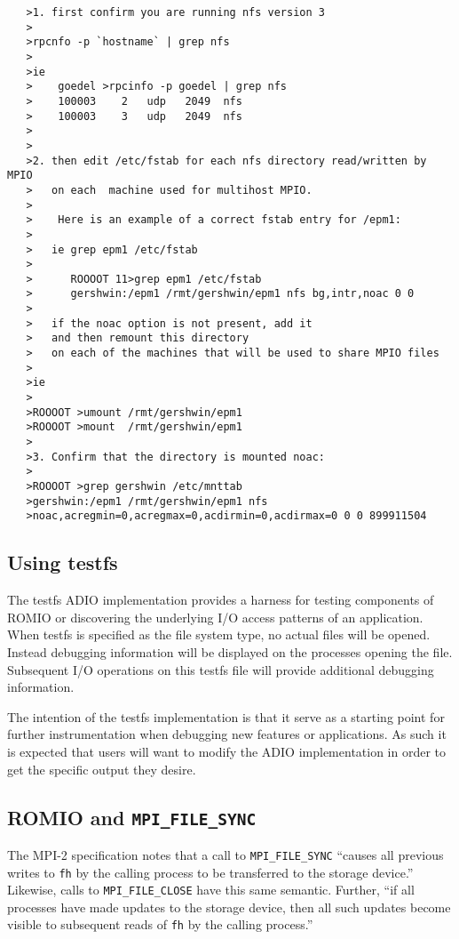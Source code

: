 \begin{verbatim}   
   >1. first confirm you are running nfs version 3
   >
   >rpcnfo -p `hostname` | grep nfs
   >
   >ie 
   >    goedel >rpcinfo -p goedel | grep nfs
   >    100003    2   udp   2049  nfs
   >    100003    3   udp   2049  nfs
   >
   >
   >2. then edit /etc/fstab for each nfs directory read/written by MPIO
   >   on each  machine used for multihost MPIO.
   >
   >    Here is an example of a correct fstab entry for /epm1:
   >
   >   ie grep epm1 /etc/fstab
   > 
   >      ROOOOT 11>grep epm1 /etc/fstab
   >      gershwin:/epm1 /rmt/gershwin/epm1 nfs bg,intr,noac 0 0
   >
   >   if the noac option is not present, add it 
   >   and then remount this directory
   >   on each of the machines that will be used to share MPIO files
   >
   >ie
   >
   >ROOOOT >umount /rmt/gershwin/epm1
   >ROOOOT >mount  /rmt/gershwin/epm1
   >
   >3. Confirm that the directory is mounted noac:
   >
   >ROOOOT >grep gershwin /etc/mnttab 
   >gershwin:/epm1 /rmt/gershwin/epm1 nfs
   >noac,acregmin=0,acregmax=0,acdirmin=0,acdirmax=0 0 0 899911504
\end{verbatim}

\subsection{Using testfs}
The testfs ADIO implementation provides a harness for testing components
of ROMIO or discovering the underlying I/O access patterns of an
application.  When testfs is specified as the file system type, no
actual files will be opened.  Instead debugging information will be
displayed on the processes opening the file.  Subsequent I/O operations
on this testfs file will provide additional debugging information.

The intention of the testfs implementation is that it serve as a
starting point for further instrumentation when debugging new features
or applications.  As such it is expected that users will want to modify
the ADIO implementation in order to get the specific output they desire.

\subsection{ROMIO and {\tt MPI\_FILE\_SYNC}}

The MPI-2 specification notes that a call to {\tt MPI\_FILE\_SYNC} ``causes
all previous writes to {\tt fh} by the calling process to be transferred to
the storage device.''  Likewise, calls to {\tt MPI\_FILE\_CLOSE} have this
same semantic.  Further, ``if all processes have made updates to the storage
device, then all such updates become visible to subsequent reads of {\tt fh}
by the calling process.''


